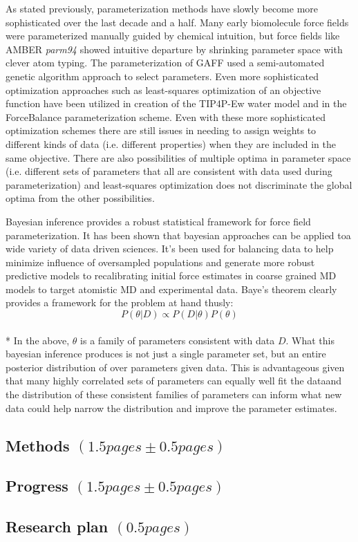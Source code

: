 \documentclass[rmp,nofootinbib,superscriptaddress,12pt,tightenlines,notitlepage]{revtex4-1}
\begin{document}
As stated previously, parameterization methods have slowly become more sophisticated over the last decade and a half. Many early biomolecule force fields were parameterized manually guided by chemical intuition, but force fields like AMBER \textit{parm94} showed intuitive departure by shrinking parameter space with clever atom typing.\cite{parm94} The parameterization of GAFF used a semi-automated genetic algorithm approach to select parameters.\cite{amber} Even more sophisticated optimization approaches such as least-squares optimization of an objective function have been utilized in creation of the TIP4P-Ew water model\cite{tip4pew} and in the ForceBalance parameterization scheme\cite{FB1,FB2,FB3}. Even with these more sophisticated optimization schemes there are still issues in needing to assign weights to different kinds of data (i.e. different properties) when they are included in the same objective. There are also possibilities of multiple optima in parameter space (i.e. different sets of parameters that all are consistent with data used during parameterization) and least-squares optimization does not discriminate the global optima from the other possibilities.


Bayesian inference provides a robust statistical framework for force field parameterization. It has been shown that bayesian approaches can be applied toa wide variety of data driven sciences. It's been used for balancing data to help minimize influence of oversampled populations and generate more robust predictive models\cite{bayes_imbalance} to recalibrating initial force estimates in coarse grained MD models to target atomistic MD and experimental data\cite{bayes_coarse}. Baye's theorem clearly provides a framework for the problem at hand thusly:
\begin{equation} P\left(\theta|D\right) \propto P\left(D|\theta\right) P\left(\theta\right)\end{equation}\\*
In the above, $\theta$ is a family of parameters consistent with data $D$. What this bayesian inference produces is not just a single parameter set, but an entire posterior distribution of over parameters given data. This is advantageous given that many highly correlated sets of parameters can equally well fit the dataand the distribution of these consistent families of parameters can inform what new data could help narrow the distribution and improve the parameter estimates.

\subsection{Methods $\left(1.5 pages \pm 0.5 pages\right)$}

\subsection{Progress $\left(1.5 pages \pm 0.5 pages\right)$}

\subsection{Research plan $\left(0.5 pages\right)$}



\end{document}
